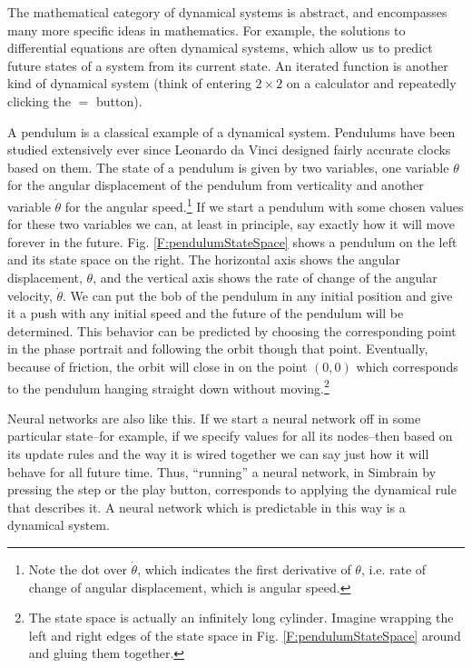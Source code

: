 The mathematical category of dynamical systems is abstract, and encompasses many more specific ideas in mathematics. For example, the solutions to differential equations are often dynamical systems, which allow us to predict future states of a system from its current state. An iterated function is another kind of dynamical system (think of entering $2 \times 2$ on a calculator and repeatedly clicking the $=$ button).

A pendulum is a classical example of a dynamical system. Pendulums have been studied extensively ever since Leonardo da Vinci designed fairly accurate clocks based on them. The state of a pendulum is given by two variables, one variable $\theta$ for the angular displacement of the pendulum from verticality and another variable $\dot{\theta}$ for the angular speed.\footnote{Note the dot over $\dot{\theta}$, which indicates the first derivative of $\theta$, i.e. rate of change of angular displacement, which is angular speed.}  If we start a pendulum with some chosen values for these two variables we can, at least in principle, say exactly how it will move forever in the future. Fig. \ref{F:pendulumStateSpace} shows a pendulum on the left and its state space on the right. The horizontal axis shows the angular displacement, $\theta$, and the vertical axis shows the rate of change of the angular velocity, $\dot{\theta}$. We can put the bob of the pendulum in any initial position and give it a push with any initial speed and the future of the pendulum will be determined. This behavior can be predicted by choosing the corresponding point in the phase portrait and following the orbit though that point. Eventually, because of friction, the orbit will close in on the point $(0,0)$ which corresponds to the pendulum hanging straight down without moving.\footnote{The state space is actually an infinitely long cylinder. Imagine wrapping the left and right edges of the state space in Fig. \ref{F:pendulumStateSpace} around and gluing them together.}

Neural networks are also like this. If we start a neural network off in some particular state--for example, if we specify values for all its nodes--then based on its 
update rules and the way it is wired together we can say just how it will behave for 
all future time. Thus, ``running'' a neural network, in Simbrain by pressing 
the step or the play button, corresponds to applying the dynamical rule that 
describes it. A neural network which is predictable in this way is a dynamical 
system. 


